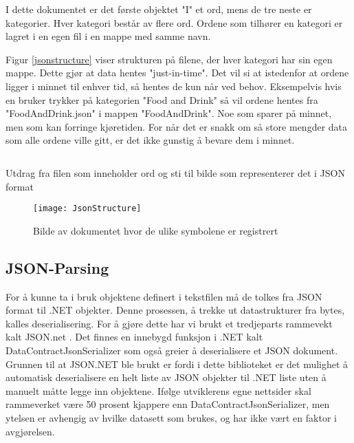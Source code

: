 I dette dokumentet er det første objektet "I" et ord, mens de tre neste er kategorier. Hver kategori består av flere ord. Ordene som tilhører en kategori er lagret i en egen fil i en mappe med samme navn. 

Figur \ref{jsonstructure} viser strukturen på filene, der hver kategori har sin egen mappe. Dette gjør at data hentes "just-in-time". Det vil si at istedenfor at ordene ligger i minnet til enhver tid, så hentes de kun når ved behov. Eksempelvis hvis en bruker trykker på kategorien "Food and Drink" så vil ordene hentes fra "FoodAndDrink.json" i mappen "FoodAndDrink". Noe som sparer på minnet, men som kan forringe kjøretiden. For når det er snakk om så store mengder data som alle ordene ville gitt, er det ikke gunstig å bevare dem i minnet. 


\begin{listing}[ht] 
\inputminted[fontsize=\footnotesize, frame=lines,framesep=2mm,baselinestretch=1.2,bgcolor=lightgray,linenos]{json}{Code/JSONfile.json} 
\caption{Utdrag fra filen som inneholder ord og sti til bilde som representerer det i JSON format} 
\label{listing:jsonfile} 
\end{listing} 
 

 \begin{figure}[ht!] 
\centering 
\texttt{[image: JsonStructure]} 
\caption{Bilde av dokumentet hvor de ulike symbolene er registrert} 
\label{fig:jsonstructure} 
\end{figure} 


\subsection{JSON-Parsing}

For å kunne ta i bruk objektene definert i tekstfilen må de tolkes fra JSON format til .NET objekter. Denne prosessen, å trekke ut datastrukturer fra bytes, kalles deserialisering. For å gjøre dette har vi brukt et tredjeparts rammevekt kalt JSON.net \cite{Json.0:online}. Det finnes en innebygd funksjon i .NET kalt DataContractJsonSerializer \cite{DataC3:online} som også greier å deserialisere et JSON dokument. Grunnen til at JSON.NET ble brukt er fordi i dette biblioteket er det mulighet å automatisk deserialisere en helt liste av JSON objekter til .NET liste uten å manuelt måtte legge inn objektene. Ifølge utviklerens egne nettsider skal rammeverket være 50 prosent kjappere enn DataContractJsonSerializer, men ytelsen er avhengig av hvilke datasett som brukes, og har ikke vært en faktor i avgjørelsen. 



